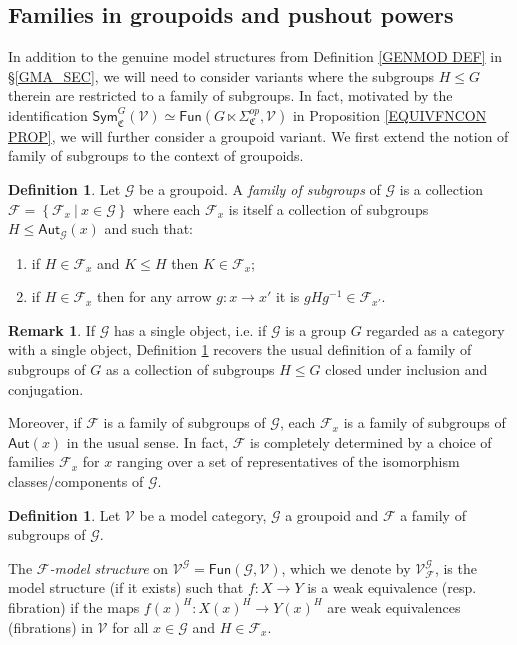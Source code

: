 \documentclass[a4paper,10pt
]{article}%
\numberwithin{equation}{section}
\numberwithin{figure}{section}
\theoremstyle{definition} %
\newtheorem{definition}[equation]{Definition}%
\newtheorem{remark}[equation]{Remark}%
\newcommand{\Fun}{\mathsf{Fun}}
\newcommand{\F}{\ensuremath{\mathcal F}}
\newcommand{\V}{\ensuremath{\mathcal V}}
\newcommand{\G}{\ensuremath{\mathcal G}}
\newcommand{\1}{\ensuremath{\mathbbm 1}}%
\begin{document}
\subsection{Families in groupoids and pushout powers}
\label{FGPP_SEC}


In addition to the genuine model structures
from Definition \ref{GENMOD DEF} in \S \ref{GMA_SEC},
we will need to consider variants
where the subgroups $H\leq G$ therein are restricted to a family of subgroups.
In fact, motivated by the identification
$\mathsf{Sym}^G_{\mathfrak{C}}(\V) \simeq 
\mathsf{Fun}(G \ltimes \Sigma^{op}_{\mathfrak{C}},\V)$
in Proposition \ref{EQUIVFNCON PROP},
we will further consider a groupoid variant.
We first extend the notion of family of subgroups to the context of groupoids.


\begin{definition}\label{FAMGROUPOID DEF}
	Let $\G$ be a groupoid.
	A \textit{family of subgroups} of $\G$
	is a collection 
	$\mathcal{F} = \left\{\mathcal{F}_x\ | \ x\in \G\right\}$
	where each $\F_x$ is itself a collection of subgroups
	$H \leq \mathsf{Aut}_{\mathcal{G}}(x)$ and such that:
	\begin{enumerate}[label = (\roman*)]
		\item if $H \in \F_x$ and $K \leq H$ then $K \in \mathcal{F}_x$;
		\item if $H \in \mathcal{F}_x$
		then for any arrow $g \colon x \to x'$
		it is $g H g^{-1} \in \mathcal{F}_{x'}$.
	\end{enumerate}
\end{definition}


\begin{remark}
	If $\G$ has a single object, i.e. if $\G$ is a group $G$ regarded as a category with a single object, Definition \ref{FAMGROUPOID DEF} recovers the usual definition of a family of subgroups of $G$ as a collection of subgroups $H\leq G$ closed under inclusion and conjugation.
	
	Moreover, if $\F$ is a family of subgroups of $\G$, each $\F_x$ is a family of subgroups of $\mathsf{Aut}(x)$ in the usual sense. 
	In fact, $\mathcal{F}$ is completely determined by a choice of families
	$\F_x$ for $x$ ranging over a set of representatives of the isomorphism classes/components of $\G$.
\end{remark}



\begin{definition}
        \label{FCMODEL_DEF}
	Let $\V$ be a model category, $\G$ a groupoid and 
	$\F$ a family of subgroups of $\G$.
	
	The \textit{$\F$-model structure} on $\V^\G = \Fun(\G, \V)$, 
	which we denote by $\V^\G_\F$,
	is the model structure (if it exists)
	such that 
	$f\colon X \to Y$
	is a weak equivalence (resp. fibration)
	if the maps $f(x)^H \colon X(x)^H \to Y(x)^H$ are weak equivalences (fibrations) in $\V$ for all $x \in \G$ and $H \in \F_x$.
\end{definition}
\end{document}
